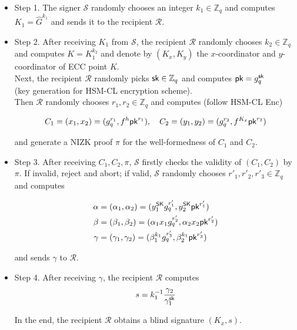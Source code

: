 \documentclass[runningheads]{llncs}
\newcommand{\sk}{{\sf sk}}
\newcommand{\pk}{{\sf pk}}
\newcommand{\SK}{{\sf SK}}
\begin{document}
	\begin{itemize}
	\item Step 1. The signer $\mathcal{S}$ randomly chooses an integer $k_1 \in \mathbb{Z}_q$  and computes $K_1 =  \hat{G}^{k_1}$ and sends it to the recipient $\mathcal{R}$.\\
	
	\item Step 2. After receiving $K_1$ from $\mathcal{S}$, the recipient $\mathcal{R}$ randomly chooses $k_2 \in \mathbb{Z}_q$ and computes $K = K_1^{ k_2}$ and denote by $(K_x,K_y)$ the $x$-coordinator and $y$-coordinator of ECC point $K$.\\
	
	Next, the recipient $\mathcal{R}$ randomly picks $\sk \in \mathbb{Z}_q$ and computes $\pk = g_q^{\sk}$ \\(key generation for HSM-CL encryption scheme). \\
	
	Then $\mathcal{R}$ randomly chooses $r_1, r_2 \in \mathbb{Z}_q$ and computes (follow HSM-CL Enc)
	
	\[
	C_1 = (x_1, x_2)=(g_q^{r_1}, f^h \pk^ {r_1}), \quad
	C_2 = (y_1,y_2)= (g_q^{r_2}, f^{K_x} \pk^ {r_2})
	\]
		
	and	generate a NIZK proof $\pi$ for the well-formedness of $C_1$ and $C_2$.\\

	\item Step 3. After receiving $C_1, C_2, \pi$, $\mathcal{S}$ firstly checks the validity of $(C_1,C_2)$ by $\pi$. If invalid, reject and abort; if valid, $\mathcal{S}$ randomly chooses $r'_1, r'_2,r'_3 \in \mathbb{Z}_q$ and computes
	
	\begin{align*}	
	\alpha&=(\alpha_1, \alpha_2)= (y_1^\SK  g_q^{r'_1}, y_2^\SK \pk ^{r'_1})\\
	\beta&= (\beta_1, \beta_2) = (\alpha_1 x_1 g_q^{r'_2}, \alpha_2 x_2 \pk^{r'_2})\\
	\gamma&=(\gamma_1, \gamma_2)= (\beta_1^{k_1}  g_q^{r'_3}, \beta_2^{k_1} \pk ^{r'_3})
	\end{align*}
	
	and sends $\gamma$ to $\mathcal{R}$.\\

	\item Step 4.
	After receiving $\gamma$, the recipient $\mathcal{R}$ computes 
	\[
	s = k_1^{-1} \frac{\gamma_2}{\gamma_1^\sk}
	\]
	
	In the end, the recipient $\mathcal{R}$ obtains a blind signature $(K_x,s)$.
	
\end{itemize}
\end{document}

